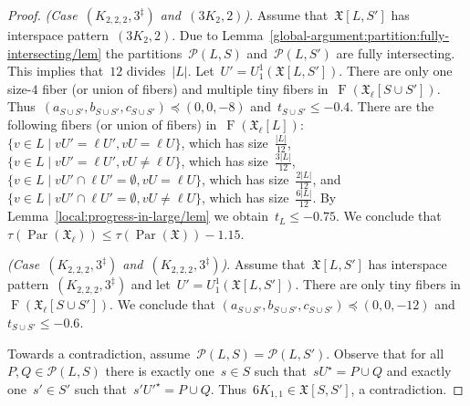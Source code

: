\documentclass[english,a4paper]{article}
\theoremstyle{plain}
\theoremstyle{definition}
\newcommand{\abs}[1]{| #1 |}
\DeclareMathOperator{\Fibers}{F}
\newcommand{\coherentConfig}{\ensuremath{\mathfrak{X}}}
\newcommand{\fibers}[1]{\ensuremath{\Fibers \left( #1 \right)}}
\newcommand{\interspace}[2]{\ensuremath{\coherentConfig[#1,#2]}}
\newcommand{\equivalenceClasses}[1]{\ensuremath{\mathcal{P}(#1)}}
\DeclareMathOperator{\parameters}{Par}
\newcommand{\ipsixMatching}             {\ensuremath{(\disjointCliques{3}{2},2)}}
\newcommand{\ipsixMatchingComplementD}{\ensuremath{(\clique{2,2,2},3^\ddag)}}
\newcommand{\clique}[1]{\ensuremath{K_{#1}}}
\newcommand{\disjointCliques}[2]{\ensuremath{#1 \clique{#2}}}
\newcommand{\matching}[1]{\ensuremath{#1 K_{1,1}}}
\begin{document}
\begin{proof}
    \textit{(Case~$\ipsixMatchingComplementD$ and~$\ipsixMatching$)}.
    Assume that~$\interspace{L}{S'}$ has interspace pattern~$\ipsixMatching$.
    Due to Lemma~\ref{global-argument:partition:fully-intersecting/lem} the partitions~$\equivalenceClasses{L,S}$ and~$\equivalenceClasses{L,S'}$ are fully intersecting.
    This implies that~$12$ divides~$|L|$.
    Let~$U' = U^1_1(\interspace{L}{S'})$.
    There are only one size-$4$ fiber (or union of fibers) and multiple tiny fibers in~$\fibers{\coherentConfig_\ell[S \cup S']}$.
    Thus~$(a_{S \cup S'},b_{S \cup S'}, c_{S \cup S'}) \preceq (0,0,-8)$ and~$t_{S \cup S'} \leq - 0.4$.
    There are the following fibers (or union of fibers) in~$\fibers{\coherentConfig_\ell[L]}$:
    $\{v \in L \mid v U' = \ell U'                    ,v U =    \ell U  \}$, which has size~$\frac{\abs{L}}{12}$,
    $\{v \in L \mid v U' = \ell U'                    ,v U \neq \ell U  \}$, which has size~$\frac{3\abs{L}}{12}$,
    $\{v \in L \mid v U' \cap \ell U' = \emptyset     ,v U =    \ell U  \}$, which has size~$\frac{2\abs{L}}{12}$, and
    $\{v \in L \mid v U' \cap \ell U' = \emptyset     ,v U \neq \ell U  \}$, which has size~$\frac{6\abs{L}}{12}$.
    By Lemma~\ref{local:progress-in-large/lem} we obtain~$t_L \leq -0.75$.
    We conclude that~$\tau(\parameters(\coherentConfig_\ell)) \leq \tau(\parameters(\coherentConfig))- 1.15$.



    \textit{(Case~$\ipsixMatchingComplementD$ and~$\ipsixMatchingComplementD$)}.
    Assume that~$\interspace{L}{S'}$ has interspace pattern~$\ipsixMatchingComplementD$ and let~$U' = U^1_1(\interspace{L}{S'})$.
    There are only tiny fibers in~$\fibers{\coherentConfig_\ell[S \cup S']}$.
    We conclude that $(a_{S \cup S'},b_{S \cup S'}, c_{S \cup S'}) \preceq (0,0,-12)$ and~$t_{S \cup S'} \leq - 0.6$.

    Towards a contradiction, assume~$\equivalenceClasses{L,S} = \equivalenceClasses{L,S'}$.
    Observe that for all~$P,Q \in \equivalenceClasses{L,S}$ there is exactly one~$s \in S$ such that~$sU^\star = P \cup Q$ and exactly one~$s' \in S'$ such that~$s'U'^\star = P \cup Q$.
    Thus~$\matching{6} \in \interspace{S}{S'}$, a contradiction.


\end{proof}
\end{document}
